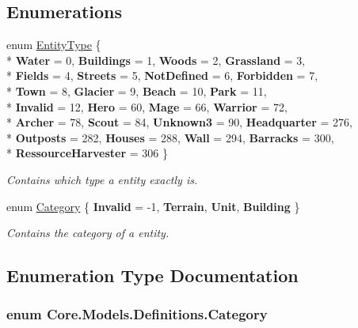 \subsection*{Enumerations}
\begin{DoxyCompactItemize}
\item 
enum \hyperlink{namespaceCore_1_1Models_1_1Definitions_a609ed13db028308ebc6c5fbd98615fdc}{Entity\-Type} \{ \\*
{\bfseries Water} = 0, 
{\bfseries Buildings} = 1, 
{\bfseries Woods} = 2, 
{\bfseries Grassland} = 3, 
\\*
{\bfseries Fields} = 4, 
{\bfseries Streets} = 5, 
{\bfseries Not\-Defined} = 6, 
{\bfseries Forbidden} = 7, 
\\*
{\bfseries Town} = 8, 
{\bfseries Glacier} = 9, 
{\bfseries Beach} = 10, 
{\bfseries Park} = 11, 
\\*
{\bfseries Invalid} = 12, 
{\bfseries Hero} = 60, 
{\bfseries Mage} = 66, 
{\bfseries Warrior} = 72, 
\\*
{\bfseries Archer} = 78, 
{\bfseries Scout} = 84, 
{\bfseries Unknown3} = 90, 
{\bfseries Headquarter} = 276, 
\\*
{\bfseries Outposts} = 282, 
{\bfseries Houses} = 288, 
{\bfseries Wall} = 294, 
{\bfseries Barracks} = 300, 
\\*
{\bfseries Ressource\-Harvester} = 306
 \}
\begin{DoxyCompactList}\small\item\em Contains which type a entity exactly is. \end{DoxyCompactList}\item 
enum \hyperlink{namespaceCore_1_1Models_1_1Definitions_a8be0403c3e883fe583d7bb3893c22c65}{Category} \{ {\bfseries Invalid} = -\/1, 
{\bfseries Terrain}, 
{\bfseries Unit}, 
{\bfseries Building}
 \}
\begin{DoxyCompactList}\small\item\em Contains the category of a entity. \end{DoxyCompactList}\end{DoxyCompactItemize}


\subsection{Enumeration Type Documentation}
\hypertarget{namespaceCore_1_1Models_1_1Definitions_a8be0403c3e883fe583d7bb3893c22c65}{
\subsubsection[{Category}]{\setlength{\rightskip}{0pt plus 5cm}enum {\bf Core.\-Models.\-Definitions.\-Category}}}\label{namespaceCore_1_1Models_1_1Definitions_a8be0403c3e883fe583d7bb3893c22c65}



